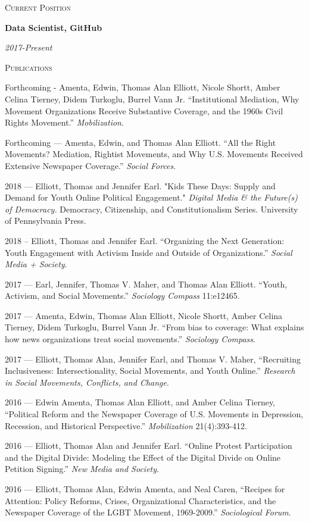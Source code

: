 \documentclass[11pt]{article}
\newcommand{\sectionheader}[1]{
{\Large
\textsc{#1}}
}
\newcommand{\resumeitem}[2]{
\begin{minipage}{0.7\textwidth}
\begin{flushleft}
\textbf{#1}
\end{flushleft}
\end{minipage}
\begin{minipage}{0.3\textwidth}
\begin{flushright}
\emph{#2}
\end{flushright}
\end{minipage}
\hangindent=0.05\textwidth
}
\begin{document}
\sectionheader{Current Position}

\resumeitem{Data Scientist, GitHub}{2017-Present}


\sectionheader{Publications}

Forthcoming - Amenta, Edwin, Thomas Alan Elliott, Nicole Shortt, Amber Celina Tierney, Didem Turkoglu, Burrel Vann Jr. ``Institutional Mediation, Why Movement Organizations Receive Substantive Coverage, and the 1960s Civil Rights Movement.'' \textit{Mobilization}.

Forthcoming --- Amenta, Edwin, and Thomas Alan Elliott. ``All the Right Movements?
Mediation, Rightist Movements, and Why U.S. Movements Received Extensive Newspaper Coverage.'' \textit{Social Forces}. 

2018 --- Elliott, Thomas and Jennifer Earl. "Kids These Days: Supply and Demand for Youth Online Political Engagement." \textit{Digital Media \& the Future(s) of Democracy.} Democracy, Citizenship, and Constitutionalism Series. University of Pennsylvania Press.

2018 -- Elliott, Thomas and Jennifer Earl. ``Organizing the Next Generation: Youth Engagement with Activism Inside and Outside of Organizations.'' \textit{Social Media + Society}.

2017 --- Earl, Jennifer, Thomas V. Maher, and Thomas Alan Elliott. ``Youth, Activism, and Social Movements.'' \textit{Sociology Compass} 11:e12465.

2017 --- Amenta, Edwin, Thomas Alan Elliott, Nicole Shortt, Amber Celina Tierney, Didem Turkoglu, Burrel Vann Jr. ``From bias to coverage: What explains how news organizations treat social movements.'' \textit{Sociology Compass}. 

2017 --- Elliott, Thomas Alan, Jennifer Earl, and Thomas V. Maher, ``Recruiting Inclusiveness: Intersectionality, Social Movements, and Youth Online.'' \textit{Research in Social Movements, Conflicts, and Change}.

2016 --- Edwin Amenta, Thomas Alan Elliott, and Amber Celina Tierney, ``Political Reform and the Newspaper Coverage of U.S. Movements in Depression, Recession, and Historical Perspective.'' \textit{Mobilization} 21(4):393-412.

2016 --- Elliott, Thomas Alan and Jennifer Earl. ``Online Protest Participation and the Digital Divide: Modeling the Effect of the Digital Divide on Online Petition Signing.'' \textit{New Media and Society}.

2016 --- Elliott, Thomas Alan, Edwin Amenta, and Neal Caren, ``Recipes for Attention: Policy Reforms, Crises, Organizational Characteristics, and the Newspaper Coverage of the LGBT Movement, 1969-2009.'' \textit{Sociological Forum}. 
\end{document}
